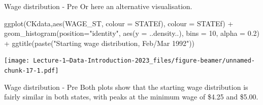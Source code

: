 \documentclass[
  ignorenonframetext,
]{beamer}
\newenvironment{Shaded}{\begin{snugshade}}{\end{snugshade}}
\newcommand{\AttributeTok}[1]{\textcolor[rgb]{0.77,0.63,0.00}{#1}}
\newcommand{\DecValTok}[1]{\textcolor[rgb]{0.00,0.00,0.81}{#1}}
\newcommand{\FloatTok}[1]{\textcolor[rgb]{0.00,0.00,0.81}{#1}}
\newcommand{\FunctionTok}[1]{\textcolor[rgb]{0.00,0.00,0.00}{#1}}
\newcommand{\NormalTok}[1]{#1}
\newcommand{\SpecialCharTok}[1]{\textcolor[rgb]{0.00,0.00,0.00}{#1}}
\newcommand{\StringTok}[1]{\textcolor[rgb]{0.31,0.60,0.02}{#1}}
\begin{document}
\begin{frame}[fragile]{Wage distribution - Pre}
\protect\hypertarget{wage-distribution---pre-1}{}
Or here an alternative visualisation.

\footnotesize

\begin{Shaded}
\begin{Highlighting}[]
\FunctionTok{ggplot}\NormalTok{(CKdata,}\FunctionTok{aes}\NormalTok{(WAGE\_ST, }\AttributeTok{colour =}\NormalTok{ STATEf), }\AttributeTok{colour =}\NormalTok{ STATEf) }\SpecialCharTok{+} 
    \FunctionTok{geom\_histogram}\NormalTok{(}\AttributeTok{position=}\StringTok{"identity"}\NormalTok{, }
                   \FunctionTok{aes}\NormalTok{(}\AttributeTok{y =}\NormalTok{ ..density..),}
                   \AttributeTok{bins =} \DecValTok{10}\NormalTok{,}
                   \AttributeTok{alpha =} \FloatTok{0.2}\NormalTok{) }\SpecialCharTok{+}
    \FunctionTok{ggtitle}\NormalTok{(}\FunctionTok{paste}\NormalTok{(}\StringTok{"Starting wage distribution, Feb/Mar 1992"}\NormalTok{))}
\end{Highlighting}
\end{Shaded}

\texttt{[image: Lecture-1---Data-Introduction-2023\_files/figure-beamer/unnamed-chunk-17-1.pdf]}
\normalsize
\end{frame}

\begin{frame}{Wage distribution - Pre}
\protect\hypertarget{wage-distribution---pre-2}{}
Both plots show that the starting wage distribution is fairly similar in
both states, with peaks at the minimum wage of \$4.25 and \$5.00.
\end{frame}
\end{document}
